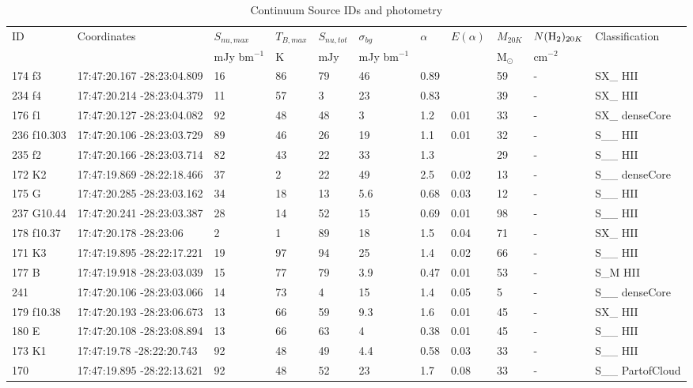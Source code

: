 \begin{table}[htp]
\caption{Continuum Source IDs and photometry}
\begin{tabular}{lllllllllll}
\label{tab:photometry}
\footnotesize
ID & Coordinates & $S_{nu,max}$ & $T_{B,max}$ & $S_{nu,tot}$ & $\sigma_{bg}$ & $\alpha$ & $E(\alpha)$ & $M_{20K}$ & $N(\textrm{H}_{2})_{20 K}$ & Classification \\
 &  & mJy bm$^{-1}$ & $\mathrm{K}$ & $\mathrm{mJy}$ & mJy bm$^{-1}$ &  &  & $\mathrm{M_{\odot}}$ & $\mathrm{cm^{-2}}$ &  \\
\hline
174 f3 & 17:47:20.167 -28:23:04.809 & 16 & 86 & 79 & 46 & 0.89 &  & 59 & - & SX\_ HII \\
234 f4 & 17:47:20.214 -28:23:04.379 & 11 & 57 & 3 & 23 & 0.83 &  & 39 & - & SX\_ HII \\
176 f1 & 17:47:20.127 -28:23:04.082 & 92 & 48 & 48 & 3 & 1.2 & 0.01 & 33 & - & SX\_ denseCore \\
236 f10.303 & 17:47:20.106 -28:23:03.729 & 89 & 46 & 26 & 19 & 1.1 & 0.01 & 32 & - & S\_\_ HII \\
235 f2 & 17:47:20.166 -28:23:03.714 & 82 & 43 & 22 & 33 & 1.3 &  & 29 & - & S\_\_ HII \\
172 K2 & 17:47:19.869 -28:22:18.466 & 37 & 2 & 22 & 49 & 2.5 & 0.02 & 13 & - & S\_\_ denseCore \\
175 G & 17:47:20.285 -28:23:03.162 & 34 & 18 & 13 & 5.6 & 0.68 & 0.03 & 12 & - & S\_\_ HII \\
237 G10.44 & 17:47:20.241 -28:23:03.387 & 28 & 14 & 52 & 15 & 0.69 & 0.01 & 98 & - & S\_\_ HII \\
178 f10.37 & 17:47:20.178 -28:23:06 & 2 & 1 & 89 & 18 & 1.5 & 0.04 & 71 & - & SX\_ HII \\
171 K3 & 17:47:19.895 -28:22:17.221 & 19 & 97 & 94 & 25 & 1.4 & 0.02 & 66 & - & S\_\_ HII \\
177 B & 17:47:19.918 -28:23:03.039 & 15 & 77 & 79 & 3.9 & 0.47 & 0.01 & 53 & - & S\_M HII \\
241 & 17:47:20.106 -28:23:03.066 & 14 & 73 & 4 & 15 & 1.4 & 0.05 & 5 & - & S\_\_ denseCore \\
179 f10.38 & 17:47:20.193 -28:23:06.673 & 13 & 66 & 59 & 9.3 & 1.6 & 0.01 & 45 & - & SX\_ HII \\
180 E & 17:47:20.108 -28:23:08.894 & 13 & 66 & 63 & 4 & 0.38 & 0.01 & 45 & - & S\_\_ HII \\
173 K1 & 17:47:19.78 -28:22:20.743 & 92 & 48 & 49 & 4.4 & 0.58 & 0.03 & 33 & - & S\_\_ HII \\
170 & 17:47:19.895 -28:22:13.621 & 92 & 48 & 52 & 23 & 1.7 & 0.08 & 33 & - & S\_\_ PartofCloud \\

\end{tabular}
\end{table}
